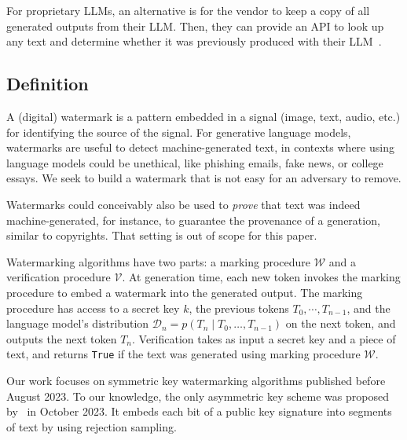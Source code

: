 For proprietary LLMs, an alternative is for the vendor to keep a copy of all generated 
outputs from their LLM. Then, they can provide an API to look up any text and determine 
whether it was previously produced with their LLM~\citep{krishna_paraphrasing_2023}.


\subsection{Definition}
\label{ssec:watermark-definition}

A (digital) watermark is a pattern embedded in a signal (image, text, audio, etc.) for 
identifying the source of the signal.
%
%
%
%
For generative language models, watermarks are useful
to detect machine-generated text, in contexts where using language models could be unethical, like phishing emails, fake news, 
or college essays.
%
We seek to build a watermark that is not easy for an adversary to remove.

Watermarks could conceivably also be used 
to \emph{prove} that text was indeed machine-generated, for instance, 
to guarantee the provenance of a generation, similar to copyrights.
%
That setting is out of scope for this paper.
%
%

Watermarking algorithms have two parts: a marking procedure $\mathcal{W}$ and a verification procedure $\mathcal{V}$.
%
At generation time, each new token invokes the marking procedure to embed a watermark into the generated output.
% 
The marking procedure has access to a secret key $k$, the previous tokens $T_0, \cdots, T_{n-1}$, and the language model's distribution $\mathcal{D}_n = p(T_n \mid T_0,\dots,T_{n-1})$ on the next token, and outputs the next token $T_n$.
%
Verification takes as input a secret key and a piece of text, and returns \texttt{True} if the text was generated using marking procedure $\mathcal{W}$.

Our work focuses on symmetric key watermarking algorithms published before August 2023. To our knowledge, 
the only asymmetric key scheme was proposed by~\citet{fairoze2023publicly} in October 2023. 
It embeds each bit of a public key signature into segments of text by using rejection sampling.

